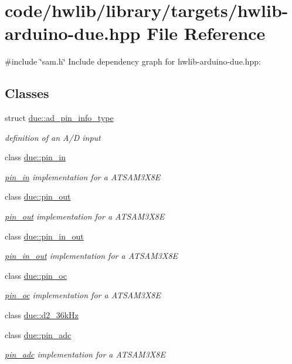 \hypertarget{hwlib-arduino-due_8hpp}{}\section{code/hwlib/library/targets/hwlib-\/arduino-\/due.hpp File Reference}
\label{hwlib-arduino-due_8hpp}
{\ttfamily \#include \char`\"{}sam.\+h\char`\"{}}\newline
Include dependency graph for hwlib-\/arduino-\/due.hpp\+:
\subsection*{Classes}
\begin{DoxyCompactItemize}
\item 
struct \hyperlink{structdue_1_1ad__pin__info__type}{due\+::ad\+\_\+pin\+\_\+info\+\_\+type}
\begin{DoxyCompactList}\small\item\em definition of an A/D input \end{DoxyCompactList}\item 
class \hyperlink{classdue_1_1pin__in}{due\+::pin\+\_\+in}
\begin{DoxyCompactList}\small\item\em \hyperlink{classdue_1_1pin__in}{pin\+\_\+in} implementation for a A\+T\+S\+A\+M3\+X8E \end{DoxyCompactList}\item 
class \hyperlink{classdue_1_1pin__out}{due\+::pin\+\_\+out}
\begin{DoxyCompactList}\small\item\em \hyperlink{classdue_1_1pin__out}{pin\+\_\+out} implementation for a A\+T\+S\+A\+M3\+X8E \end{DoxyCompactList}\item 
class \hyperlink{classdue_1_1pin__in__out}{due\+::pin\+\_\+in\+\_\+out}
\begin{DoxyCompactList}\small\item\em \hyperlink{classdue_1_1pin__in__out}{pin\+\_\+in\+\_\+out} implementation for a A\+T\+S\+A\+M3\+X8E \end{DoxyCompactList}\item 
class \hyperlink{classdue_1_1pin__oc}{due\+::pin\+\_\+oc}
\begin{DoxyCompactList}\small\item\em \hyperlink{classdue_1_1pin__oc}{pin\+\_\+oc} implementation for a A\+T\+S\+A\+M3\+X8E \end{DoxyCompactList}\item 
class \hyperlink{classdue_1_1d2__36kHz}{due\+::d2\+\_\+36k\+Hz}
\item 
class \hyperlink{classdue_1_1pin__adc}{due\+::pin\+\_\+adc}
\begin{DoxyCompactList}\small\item\em \hyperlink{classdue_1_1pin__adc}{pin\+\_\+adc} implementation for a A\+T\+S\+A\+M3\+X8E \end{DoxyCompactList}\end{DoxyCompactItemize}
